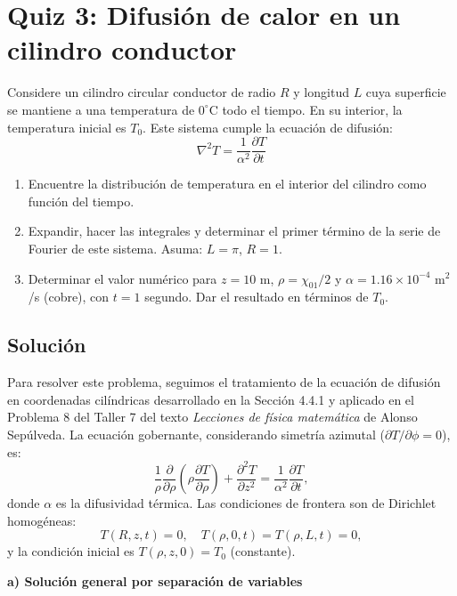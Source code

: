 \documentclass[a4paper]{article}
\begin{document}
\section{Quiz 3: Difusión de calor en un cilindro conductor}
Considere un cilindro circular conductor de radio $R$ y longitud $L$ cuya superficie se mantiene a una temperatura de $0^\circ$C todo el tiempo. En su interior, la temperatura inicial es $T_0$. Este sistema cumple la ecuación de difusión:
$$\nabla^2 T = \frac{1}{\alpha^2} \frac{\partial T}{\partial t}$$
\begin{enumerate}
\item[a)] Encuentre la distribución de temperatura en el interior del cilindro como función del tiempo.
\item[b)] Expandir, hacer las integrales y determinar el primer término de la serie de Fourier de este sistema. Asuma: $L = \pi$, $R = 1$.
\item[c)] Determinar el valor numérico para $z = 10$ m, $\rho = \chi_{01}/2$ y $\alpha = 1.16 \times 10^{-4}$ m$^2$/s (cobre), con $t = 1$ segundo. Dar el resultado en términos de $T_0$.
\end{enumerate}

\subsection{Solución}
Para resolver este problema, seguimos el tratamiento de la ecuación de difusión en coordenadas cilíndricas desarrollado en la Sección 4.4.1 y aplicado en el Problema 8 del Taller 7 del texto \textit{Lecciones de física matemática} de Alonso Sepúlveda. La ecuación gobernante, considerando simetría azimutal ($\partial T/\partial\phi = 0$), es:
$$\frac{1}{\rho}\frac{\partial}{\partial\rho}\left(\rho\frac{\partial T}{\partial\rho}\right) + \frac{\partial^2 T}{\partial z^2} = \frac{1}{\alpha^2}\frac{\partial T}{\partial t},$$
donde $\alpha$ es la difusividad térmica. Las condiciones de frontera son de Dirichlet homogéneas:
$$T(R,z,t) = 0, \quad T(\rho,0,t) = T(\rho,L,t) = 0,$$
y la condición inicial es $T(\rho,z,0) = T_0$ (constante).

\textbf{a) Solución general por separación de variables}
\end{document}
